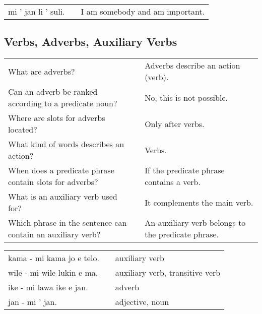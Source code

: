 \begin{supertabular}{p{5,5cm}|ll}
    mi ' jan li ' suli. &  & I am somebody and am important. \\
\end{supertabular}

\newpage

\subsection*{Verbs, Adverbs, Auxiliary Verbs}
\label{'adverbs'}

\begin{supertabular}{p{5,5cm}|ll}
    What are adverbs?                                           &  & Adverbs describe an action (verb).                 \\
    Can an adverb be ranked according to a predicate noun?      &  & No, this is not possible.                          \\
    Where are slots for adverbs located?                        &  & Only after verbs.                                  \\
    What kind of words describes an action?                     &  & Verbs.                                             \\
    When does a predicate phrase contain slots for adverbs?     &  & If the predicate phrase contains a verb.           \\
    What is an auxiliary verb used for?                         &  & It complements the main verb.                      \\
    Which phrase in the sentence can contain an auxiliary verb? &  & An auxiliary verb belongs to the predicate phrase. \\
\end{supertabular}

\begin{supertabular}{p{5,5cm}|ll}
    kama - mi kama jo e telo.  &  & auxiliary verb                  \\
    wile - mi wile lukin e ma. &  & auxiliary verb, transitive verb \\
    ike - mi lawa ike e jan.   &  & adverb                          \\
    jan - mi ' jan.            &  & adjective, noun                 \\
\end{supertabular}

